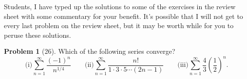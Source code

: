 \documentclass[10pt]{article}
\theoremstyle{plain}
\theoremstyle{definition}
\newtheorem*{problem*}{Problem}
\theoremstyle{remark}
\begin{document}
\author{TA: \href{mailto:\authoremail}{\documentauthor}}
\title{\documenttitle}
\date{\today}
\maketitle
Students, I have typed up the solutions to some of the exercises in the
review sheet with some commentary for your benefit. It's possible that I
will not get to every last problem on the review sheet, but it may be worth
while for you to peruse these solutions.

\begin{problem*}[26]
Which of the following series converge?
\[
\text{(i)}\sum_{n=1}^\infty\frac{(-1)^n}{n^{1/4}}\qquad
\text{(ii)}\sum_{n=1}^\infty\frac{n!}{1\cdot 3\cdot 5\dotsm (2n-1)}\qquad
\text{(iii)}\sum_{n=1}^\infty\frac{4}{3}\left(\frac{1}{2}\right)^n.
\]
\end{problem*}
\end{document}
